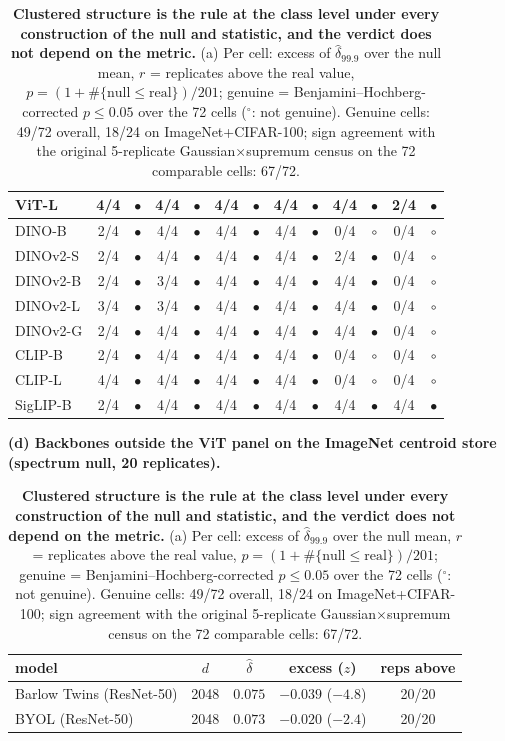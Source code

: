 \begin{table}[H]
\begin{tabular}{lcccccccccccc}
ViT-L & 4/4 & $\bullet$ & 4/4 & $\bullet$ & 4/4 & $\bullet$ & 4/4 & $\bullet$ & 4/4 & $\bullet$ & 2/4 & $\bullet$ \\
\midrule
DINO-B & 2/4 & $\bullet$ & 4/4 & $\bullet$ & 4/4 & $\bullet$ & 4/4 & $\bullet$ & 0/4 & $\circ$ & 0/4 & $\circ$ \\
DINOv2-S & 2/4 & $\bullet$ & 4/4 & $\bullet$ & 4/4 & $\bullet$ & 4/4 & $\bullet$ & 2/4 & $\bullet$ & 0/4 & $\circ$ \\
DINOv2-B & 2/4 & $\bullet$ & 3/4 & $\bullet$ & 4/4 & $\bullet$ & 4/4 & $\bullet$ & 4/4 & $\bullet$ & 0/4 & $\circ$ \\
DINOv2-L & 3/4 & $\bullet$ & 3/4 & $\bullet$ & 4/4 & $\bullet$ & 4/4 & $\bullet$ & 4/4 & $\bullet$ & 0/4 & $\circ$ \\
DINOv2-G & 2/4 & $\bullet$ & 4/4 & $\bullet$ & 4/4 & $\bullet$ & 4/4 & $\bullet$ & 4/4 & $\bullet$ & 0/4 & $\circ$ \\
\midrule
CLIP-B & 2/4 & $\bullet$ & 4/4 & $\bullet$ & 4/4 & $\bullet$ & 4/4 & $\bullet$ & 0/4 & $\circ$ & 0/4 & $\circ$ \\
CLIP-L & 4/4 & $\bullet$ & 4/4 & $\bullet$ & 4/4 & $\bullet$ & 4/4 & $\bullet$ & 0/4 & $\circ$ & 0/4 & $\circ$ \\
SigLIP-B & 2/4 & $\bullet$ & 4/4 & $\bullet$ & 4/4 & $\bullet$ & 4/4 & $\bullet$ & 4/4 & $\bullet$ & 4/4 & $\bullet$ \\
\bottomrule
\end{tabular}
\par\vspace{5pt}
\endgroup
\begingroup
\noindent\textbf{(d) Backbones outside the ViT panel on the ImageNet centroid store (spectrum null, 20 replicates).}\par\vspace{1.5pt}
\footnotesize
\setlength{\tabcolsep}{4pt}
\begin{tabular}{lcccc}
\toprule
model & $d$ & $\hat\delta$ & excess ($z$) & reps above \\
\midrule
Barlow Twins (ResNet-50) & 2048 & $0.075$ & $-0.039$ ($-4.8$) & 20/20 \\
BYOL (ResNet-50) & 2048 & $0.073$ & $-0.020$ ($-2.4$) & 20/20 \\
\bottomrule
\end{tabular}
\par\vspace{5pt}
\endgroup
\caption{\textbf{Clustered structure is the rule at the class level under every construction of the null and statistic, and the verdict does not depend on the metric.} (a) Per cell: excess of $\hat\delta_{99.9}$ over the null mean, $r$ = replicates above the real value, $p=(1+\#\{\text{null}\le\text{real}\})/201$; genuine = Benjamini--Hochberg-corrected $p\le0.05$ over the 72 cells ($^{\circ}$: not genuine). Genuine cells: 49/72 overall, 18/24 on ImageNet+CIFAR-100; sign agreement with the original 5-replicate Gaussian$\times$supremum census on the 72 comparable cells: 67/72.  %
}
\label{tab:q1-census}
\end{table}
